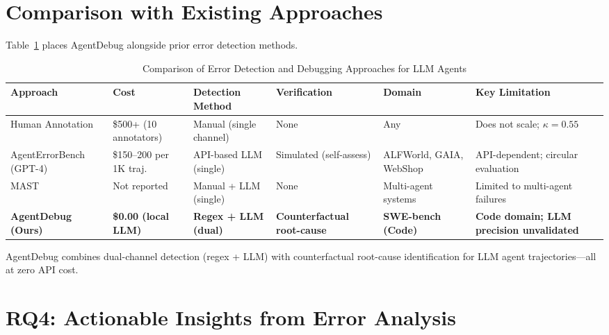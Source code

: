 \documentclass{ieeeaccess}
\begin{document}
\section{Comparison with Existing Approaches}
\label{sec:comparison}

Table~\ref{tab:comparison} places AgentDebug alongside prior error detection methods.

\begin{table}[ht!]
\caption{Comparison of Error Detection and Debugging Approaches for LLM Agents}
\label{tab:comparison}
\centering
\setlength{\tabcolsep}{3pt}
\renewcommand{\arraystretch}{1.5}
\begin{tabularx}{\textwidth}{|X|X|X|X|X|X|}
\hline
\textbf{Approach} & \textbf{Cost} & \textbf{Detection Method} & \textbf{Verification} & \textbf{Domain} & \textbf{Key Limitation} \\
\hline

Human Annotation \cite{b5} &
\$500+ (10 annotators) &
Manual (single channel) &
None &
Any &
Does not scale; $\kappa = 0.55$ \\
\hline

AgentErrorBench \cite{b5} (GPT-4) &
\$150--200 per 1K traj. &
API-based LLM (single) &
Simulated (self-assess) &
ALFWorld, GAIA, WebShop &
API-dependent; circular evaluation \\
\hline

MAST \cite{b6} &
Not reported &
Manual + LLM (single) &
None &
Multi-agent systems &
Limited to multi-agent failures \\
\hline

\textbf{AgentDebug (Ours)} &
\textbf{\$0.00 (local LLM)} &
\textbf{Regex + LLM (dual)} &
\textbf{Counterfactual root-cause} &
\textbf{SWE-bench (Code)} &
\textbf{Code domain; LLM precision unvalidated} \\
\hline
\end{tabularx}
\end{table}

AgentDebug combines dual-channel detection (regex + LLM) with counterfactual root-cause identification for LLM agent trajectories---all at zero API cost.


\section{RQ4: Actionable Insights from Error Analysis}
\label{sec:insights}
\end{document}
